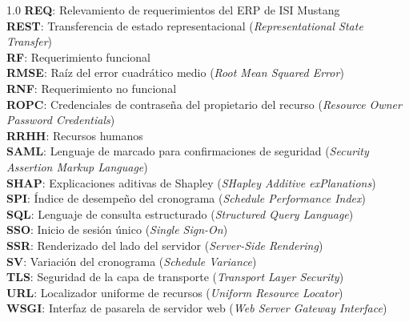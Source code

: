 \documentclass{univalle-perfil}
\begin{document}
\begin{spacing}{1.0}
  \textbf{REQ}: Relevamiento de requerimientos del ERP de ISI Mustang\\
  \textbf{REST}: Transferencia de estado representacional (\textit{Representational State Transfer})\\
  \textbf{RF}: Requerimiento funcional\\
  \textbf{RMSE}: Raíz del error cuadrático medio (\textit{Root Mean Squared Error})\\
  \textbf{RNF}: Requerimiento no funcional\\
  \textbf{ROPC}: Credenciales de contraseña del propietario del recurso (\textit{Resource Owner Password Credentials})\\
  \textbf{RRHH}: Recursos humanos\\
  \textbf{SAML}: Lenguaje de marcado para confirmaciones de seguridad (\textit{Security Assertion Markup Language})\\
  \textbf{SHAP}: Explicaciones aditivas de Shapley (\textit{SHapley Additive exPlanations})\\
  \textbf{SPI}: Índice de desempeño del cronograma (\textit{Schedule Performance Index})\\
  \textbf{SQL}: Lenguaje de consulta estructurado (\textit{Structured Query Language})\\
  \textbf{SSO}: Inicio de sesión único (\textit{Single Sign-On})\\
  \textbf{SSR}: Renderizado del lado del servidor (\textit{Server-Side Rendering})\\
  \textbf{SV}: Variación del cronograma (\textit{Schedule Variance})\\
  \textbf{TLS}: Seguridad de la capa de transporte (\textit{Transport Layer Security})\\
  \textbf{URL}: Localizador uniforme de recursos (\textit{Uniform Resource Locator})\\
  \textbf{WSGI}: Interfaz de pasarela de servidor web (\textit{Web Server Gateway Interface})\\
\end{spacing}

\clearpage
\pagestyle{fancy}







\end{document}
